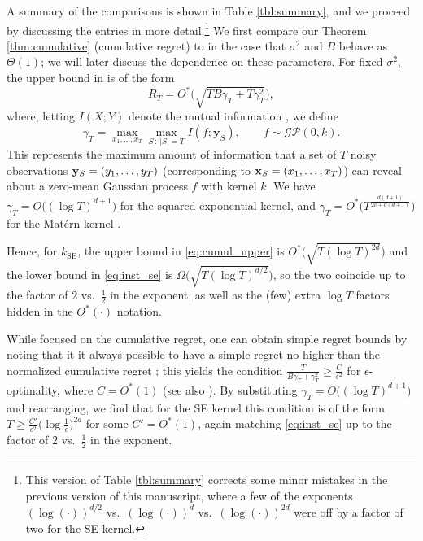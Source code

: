 \documentclass[english,onecolumn,final,11pt]{IEEEtran} %
\newcommand{\kSE}{k_{\text{SE}}}
\begin{document}
A summary of the comparisons is shown in Table \ref{tbl:summary}, and we proceed by discussing the entries in more detail.\footnote{This version of Table \ref{tbl:summary} corrects some minor mistakes in the previous version of this manuscript, where a few of the exponents $(\log(\cdot))^{d/2}$ vs.~$(\log(\cdot))^{d}$ vs.~$(\log(\cdot))^{2d}$ were off by a factor of two for the SE kernel.}  We first compare our Theorem \ref{thm:cumulative} (cumulative regret) to \cite{Sri09} in the case that $\sigma^2$ and $B$ behave as $\Theta(1)$; we will later discuss the dependence on these parameters.  For fixed $\sigma^2$, the upper bound in \cite{Sri09} is of the form
\begin{equation}
    R_T = O^*\big(\sqrt{TB\gamma_T + T\gamma_T^2}\big), \label{eq:cumul_upper}
\end{equation} 
where, letting $I(X;Y)$ denote the mutual information \cite{Cov01}, we define
\begin{equation} 
    \gamma_T = \max_{x_1,\dotsc,x_T} \max_{S \,:\, |S| = T} I(f;\mathbf{y}_S), \qquad f \sim \mathcal{GP}(0,k). \label{eq:gamma_def}
\end{equation}
This represents the maximum amount of information that a set of $T$ noisy observations $\mathbf{y}_S = (y_1,\dotsc,y_T)$ (corresponding to $\mathbf{x}_S = (x_1,\dotsc,x_T)$) can reveal about a zero-mean Gaussian process $f$ with kernel $k$. We have $\gamma_T = O\big( (\log T)^{d+1}\big)$ for the squared-exponential kernel, and $\gamma_T = O^*\big( T^{\frac{d(d+1)}{2\nu + d(d+1)}}\big)$ for the Mat\'ern kernel \cite{Sri09}.

Hence, for $\kSE$, the upper bound in \eqref{eq:cumul_upper} is $O^*\big( \sqrt{T (\log T)^{2d}} \big)$ and the lower bound in \eqref{eq:inst_se} is $\Omega\big( \sqrt{T (\log T)^{d/2}} \big)$, so the two coincide up to the factor of $2$ vs.~$\frac{1}{2}$ in the exponent, as well as the (few) extra $\log T$ factors hidden in the $O^*(\cdot)$ notation.  

While \cite{Sri09} focused on the cumulative regret, one can obtain simple regret bounds by noting that it it always possible to have a simple regret no higher than the normalized cumulative regret \cite{Bub09}; this yields the condition $\frac{T}{B\gamma_T + \gamma_T^2} \ge \frac{C}{\epsilon^2}$ for $\epsilon$-optimality, where $C = O^*(1)$ (see also \cite{Con13,Bog16a}).  By substituting $\gamma_T = O\big( (\log T)^{d+1}\big)$ and rearranging, we find that for the SE kernel this condition is of the form $T \ge \frac{C'}{\epsilon^2} \big(\log\frac{1}{\epsilon}\big)^{2d}$ for some $C' = O^*(1)$, again matching \eqref{eq:inst_se} up to the factor of  $2$ vs.~$\frac{1}{2}$ in the exponent.
\end{document}
